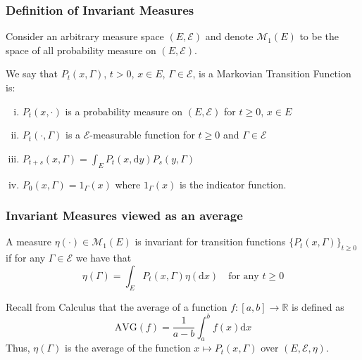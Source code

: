 \documentclass[11pt]{beamer}
\numberwithin{equation}{section}
\newcommand{\R}{\mathbb{R}}
\newcommand{\ud}{\ensuremath{\mathrm{d}}}
\begin{document}
\begin{frame}[t]
	\frametitle{Definition of Invariant Measures}
	Consider an arbitrary measure space $(E,\mathscr E)$ and denote $\mathcal M_1(E)$ to be the space of all probability measure on $(E,\mathscr E)$.
	\begin{definition}  We say that $P_t(x,\Gamma)$, $t>0$, $x\in E$, $\Gamma \in \mathcal E$, is a Markovian Transition Function is:

		\begin{enumerate}[(i)]
			\item $P_t(x,\cdot)$ is a probability measure on $(E,\mathscr E)$ for $t \ge 0$, $x \in  E$
			\item $P_t(\cdot,\Gamma)$ is a $\mathscr E$-measurable function for $t \ge 0$ and $\Gamma \in \mathscr E$
			\item $P_{t+s}(x,\Gamma) = \int_EP_t(x,\ud y)P_s(y,\Gamma)$
			\item $P_0(x,\Gamma)=1_\Gamma(x)$ where $1_\Gamma(x)$ is the indicator function.
		\end{enumerate}
	\end{definition}

\end{frame}

\begin{frame}[t]
	\frametitle{Invariant Measures viewed as an average}
	\begin{definition} 
		A measure $\eta(\cdot) \in \mathcal M_1(E)$ is invariant for transition functions $\{P_t(x,\Gamma)\} _{t\ge 0}$ if for any $\Gamma \in \mathscr E$ we have that $$ \eta(\Gamma) = \int_E P_t(x,\Gamma)\eta(\ud x) \quad \text{for any $t\ge 0$} $$
	\end{definition}

	Recall from Calculus that the average of a function $f:[a,b] \to \R$ is defined as
	$$ \text{AVG}(f) = \dfrac{1}{a-b}\int_a^b f(x) \ud x$$
	 Thus,  $\eta(\Gamma)$ is the average of the function $ x \mapsto P_t(x,\Gamma)$ over  $(E,\mathscr E, \eta)$.

\end{frame}
\end{document}
